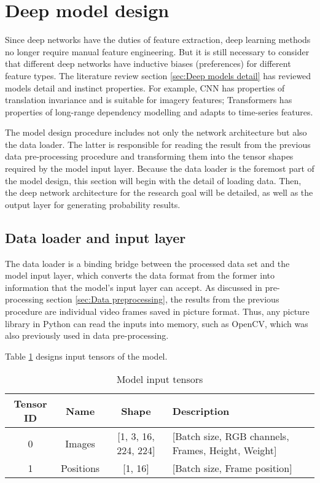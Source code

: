 \section{Deep model design}
\label{sec:Deep model design}
Since deep networks have the duties of feature extraction, deep learning methods no longer require manual feature engineering.
But it is still necessary to consider that different deep networks have inductive biases (preferences) for different feature types.
The literature review section \ref{sec:Deep models detail} has reviewed models detail and instinct properties.
For example, CNN has properties of translation invariance and is suitable for imagery features; Transformers has properties of long-range dependency modelling and adapts to time-series features.

The model design procedure includes not only the network architecture but also the data loader.
The latter is responsible for reading the result from the previous data pre-processing procedure and transforming them into the tensor shapes required by the model input layer.
Because the data loader is the foremost part of the model design, this section will begin with the detail of loading data.
Then, the deep network architecture for the research goal will be detailed, as well as the output layer for generating probability results.

\subsection{Data loader and input layer}
The data loader is a binding bridge between the processed data set and the model input layer, which converts the data format from the former into information that the model's input layer can accept.
As discussed in pre-processing section \ref{sec:Data preprocessing}, the results from the previous procedure are individual video frames saved in picture format.
Thus, any picture library in Python can read the inputs into memory, such as OpenCV, which was also previously used in data pre-processing.

Table \ref{tab:Model input tensors} designs input tensors of the model.


\begin{table}[!ht]
\renewcommand{\arraystretch}{1.6}
\begin{tabularx}{\textwidth}{|c|c|c|X|}
\hline
Tensor ID & Name           & Shape                    & Description                                            \\ \hline
0         & Images   & {[}1, 3, 16, 224, 224{]} & {[}Batch size, RGB channels, Frames, Height, Weight{]} \\ \hline
1         & Positions & {[}1, 16{]}              & {[}Batch size, Frame position{]}                       \\ \hline
\end{tabularx}
\caption{Model input tensors}
\label{tab:Model input tensors}
\end{table}

